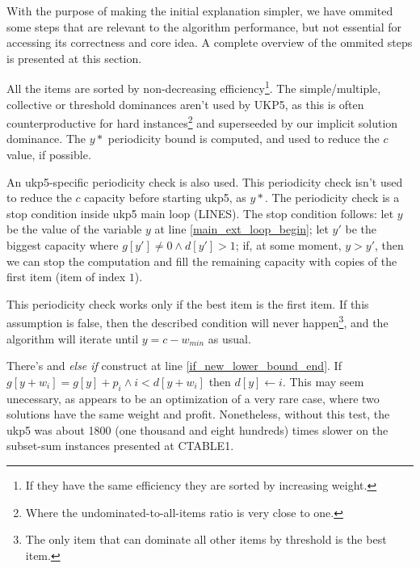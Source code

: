 \documentclass[runningheads,a4paper]{llncs}
\begin{document}
With the purpose of making the initial explanation simpler, we have ommited some steps that are relevant to the algorithm performance, but not essential for accessing its correctness and core idea. A complete overview of the ommited steps is presented at this section.

All the items are sorted by non-decreasing efficiency\footnote{If they have the same efficiency they are sorted by increasing weight.}. The simple/multiple, collective or threshold dominances aren't used by UKP5, as this is often counterproductive for hard instances\footnote{Where the undominated-to-all-items ratio is very close to one.} and superseeded by our implicit solution dominance. The \(y*\) periodicity bound is computed\cite[p. 223]{CGAR}, and used to reduce the \(c\) value, if possible.

An ukp5-specific periodicity check is also used. This periodicity check isn't used to reduce the \(c\) capacity before starting ukp5, as \(y*\). The periodicity check is a stop condition inside ukp5 main loop (LINES). The stop condition follows: let \(y\) be the value of the variable \(y\) at line \ref{main_ext_loop_begin}; let \(y'\) be the biggest capacity where \(g[y'] \neq 0 \land d[y'] > 1\); if, at some moment, \(y > y'\), then we can stop the computation and fill the remaining capacity with copies of the first item (item of index \(1\)).%


This periodicity check works only if the best item is the first item. If this assumption is false, then the described condition will never happen\footnote{The only item that can dominate all other items by threshold is the best item.}, and the algorithm will iterate until \(y = c - w_{min}\) as usual.

There's and \emph{else if} construct at line \ref{if_new_lower_bound_end}. If \(g[y + w_i] = g[y] + p_i \land i < d[y + w_i]\) then \(d[y] \gets i\). This may seem unecessary, as appears to be an optimization of a very rare case, where two solutions have the same weight and profit. Nonetheless, without this test, the ukp5 was about 1800 (one thousand and eight hundreds) times slower on the subset-sum instances presented at CTABLE1.
\end{document}
